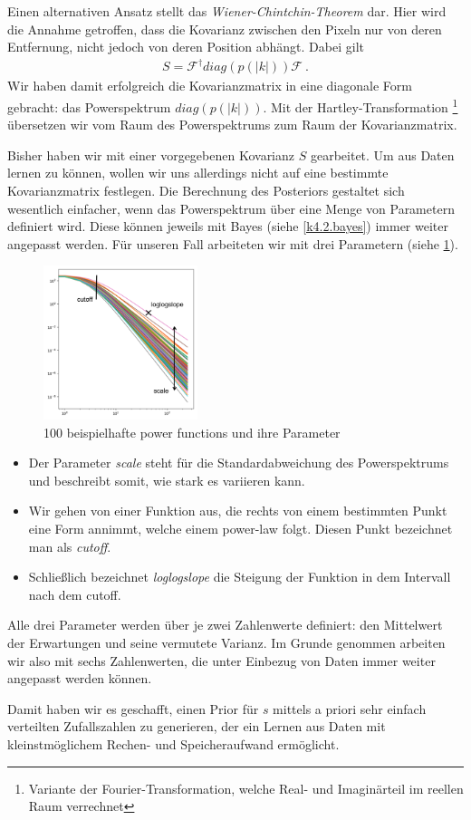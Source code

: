 Einen alternativen Ansatz stellt das \emph{Wiener-Chintchin-Theorem} dar. Hier wird die Annahme getroffen, dass die Kovarianz zwischen den Pixeln nur von deren Entfernung, nicht jedoch von deren Position abhängt. Dabei gilt
\begin{eqnarray}
S= \mathcal{F}^{\dagger} diag(p(|k|)) \mathcal{F} \ .
\end{eqnarray}
Wir haben damit erfolgreich die Kovarianzmatrix in eine diagonale Form gebracht: das Powerspektrum $diag(p(|k|))$. Mit der Hartley-Transformation \footnote{Variante der Fourier-Transformation, welche Real- und Imaginärteil im reellen Raum verrechnet} übersetzen wir vom Raum des Powerspektrums zum Raum der Kovarianzmatrix.

Bisher haben wir mit einer vorgegebenen Kovarianz $S$ gearbeitet. Um aus Daten lernen zu können, wollen wir uns allerdings nicht auf eine bestimmte Kovarianzmatrix festlegen. Die Berechnung des Posteriors gestaltet sich wesentlich einfacher, wenn das Powerspektrum über eine Menge von Parametern definiert wird. Diese können jeweils mit Bayes (siehe \cref{k4.2.bayes}) immer weiter angepasst werden. Für unseren Fall arbeiteten wir mit drei Parametern (siehe \cref{k4.2.power-function.img}).
\begin{figure}
    \centering
    \includegraphics[width=0.4\textwidth]{k4.2/power_function_bearbeitet.png}
    \caption{100 beispielhafte power functions und ihre Parameter}
    \label{k4.2.power-function.img}
\end{figure}
\begin{itemize}
    \item Der Parameter \emph{scale} steht für die Standardabweichung des Powerspektrums und beschreibt somit, wie stark es variieren kann.
    \item Wir gehen von einer Funktion aus, die rechts von einem bestimmten Punkt eine Form annimmt, welche einem power-law folgt. Diesen Punkt bezeichnet man als \emph{cutoff}.
    \item Schließlich bezeichnet \emph{loglogslope} die Steigung der Funktion in dem Intervall nach dem cutoff.
\end{itemize}
Alle drei Parameter werden über je zwei Zahlenwerte definiert: den Mittelwert der Erwartungen und seine vermutete Varianz. Im Grunde genommen arbeiten wir also mit sechs Zahlenwerten, die unter Einbezug von Daten immer weiter angepasst werden können.

Damit haben wir es geschafft, einen Prior für $s$ mittels a priori sehr einfach verteilten Zufallszahlen zu generieren, der ein Lernen aus Daten mit kleinstmöglichem Rechen- und Speicheraufwand ermöglicht.
